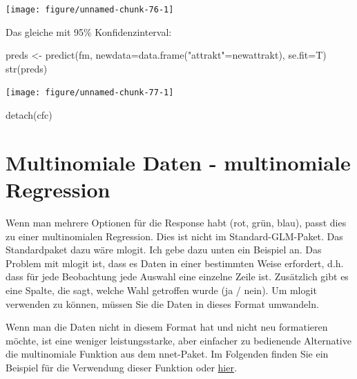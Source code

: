 \documentclass[a4paper,twoside]{tufte-book}\usepackage[]{graphicx}\usepackage[]{color}
\begin{document}
\begin{appendices}
\begin{Schunk}
\texttt{[image: figure/unnamed-chunk-76-1]} \end{Schunk}

Das gleiche mit 95\% Konfidenzinterval:

\begin{Schunk}
\begin{Sinput}
preds <- predict(fm, newdata=data.frame("attrakt"=newattrakt), se.fit=T)
str(preds)
\end{Sinput}

\texttt{[image: figure/unnamed-chunk-77-1]} \begin{Sinput}
detach(cfc)
\end{Sinput}
\end{Schunk}


\section{Multinomiale Daten - multinomiale Regression}

Wenn man mehrere Optionen für die Response habt (rot, grün, blau), passt dies zu einer multinomialen Regression. Dies ist nicht im Standard-GLM-Paket. Das Standardpaket dazu wäre mlogit. Ich gebe dazu unten ein Beispiel an. Das Problem mit mlogit ist, dass es Daten in einer bestimmten Weise erfordert, d.h. dass für jede Beobachtung jede Auswahl eine einzelne Zeile ist. Zusätzlich gibt es eine Spalte, die sagt, welche Wahl getroffen wurde (ja / nein). Um mlogit verwenden zu können, müssen Sie die Daten in dieses Format umwandeln.

Wenn man die Daten nicht in diesem Format hat und nicht neu formatieren möchte, ist eine weniger leistungsstarke, aber einfacher zu bedienende Alternative die multinomiale Funktion aus dem nnet-Paket. Im Folgenden finden Sie ein Beispiel für die Verwendung dieser Funktion oder \href{http://www.ats.ucla.edu/stat/stata/dae/mlogit.htm}{hier}.


\end{appendices}
\end{document}
